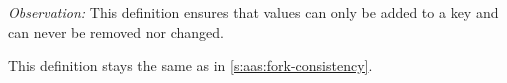 %

\noindent \textit{Observation:}
This definition ensures that values can only be added to a key and can never be removed nor changed.

This definition stays the same as in \cref{s:aas:fork-consistency}.
